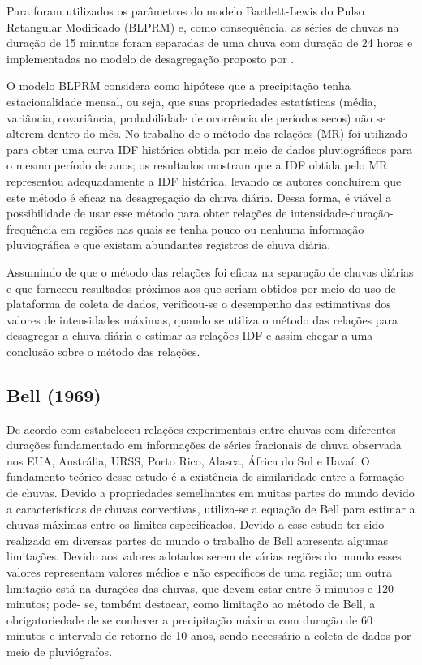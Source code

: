 Para  foram utilizados os parâmetros do modelo Bartlett-Lewis do Pulso Retangular Modificado (BLPRM) \cite{iturbe} e, como consequência, as séries de chuvas na duração de 15 minutos foram separadas de uma chuva com duração de 24 horas e implementadas no modelo de desagregação proposto por .

O modelo BLPRM considera como hipótese que a precipitação tenha estacionalidade mensal, ou seja, que suas propriedades estatísticas (média, variância, covariância, probabilidade de ocorrência de períodos secos) não se alterem dentro do mês. No trabalho de \cite{chuva-diaria} o método das relações (MR) foi utilizado para obter uma curva IDF histórica obtida por meio de dados pluviográficos para o mesmo período de anos; os resultados mostram que a IDF obtida pelo MR representou adequadamente a IDF histórica, levando os autores concluírem que este método é eficaz na desagregação da chuva diária. Dessa forma, é viável a possibilidade de usar esse método para obter relações de intensidade-duração-frequência em regiões nas quais se tenha pouco ou nenhuma informação pluviográfica e que existam abundantes registros de chuva diária.

Assumindo de que o método das relações foi eficaz na separação de chuvas diárias e que forneceu resultados próximos aos que seriam obtidos por meio do uso de plataforma de coleta de dados, verificou-se o desempenho das estimativas dos valores de intensidades máximas, quando se utiliza o método das relações para desagregar a chuva diária e estimar as relações IDF e assim chegar a uma conclusão sobre o método das relações.

\subsection{Bell (1969)}

De acordo com  estabeleceu relações experimentais entre chuvas com diferentes durações fundamentado em informações de séries fracionais de chuva observada nos EUA, Austrália, URSS, Porto Rico, Alasca, África do Sul e Havaí. O fundamento teórico desse estudo é a existência de similaridade entre a formação de chuvas. Devido a propriedades semelhantes em muitas partes do mundo devido a características de chuvas convectivas,  utiliza-se a equação de Bell para estimar a chuvas máximas entre os limites especificados. Devido a esse estudo ter sido realizado em diversas partes do mundo o trabalho de Bell apresenta algumas limitações. Devido aos valores adotados serem de várias regiões do mundo esses valores representam valores médios e não específicos de uma região; um outra limitação está na durações das chuvas, que devem estar entre 5 minutos e 120 minutos; pode- se, também destacar, como limitação ao método de Bell, a obrigatoriedade de se conhecer a precipitação máxima com duração de 60 minutos e intervalo de retorno de 10 anos, sendo necessário a coleta de dados por meio de pluviógrafos.

